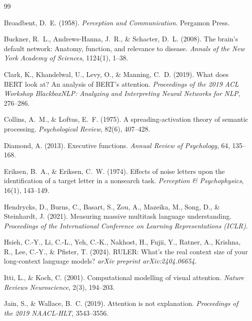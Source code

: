 \documentclass{article}
\begin{document}

\begin{thebibliography}{99}

Broadbent, D.~E. (1958). \emph{Perception and Communication}. Pergamon Press.

Buckner, R.~L., Andrews-Hanna, J.~R., \& Schacter, D.~L. (2008). The brain's default network: Anatomy, function, and relevance to disease. \emph{Annals of the New York Academy of Sciences}, 1124(1), 1--38.

Clark, K., Khandelwal, U., Levy, O., \& Manning, C.~D. (2019). What does BERT look at? An analysis of BERT's attention. \emph{Proceedings of the 2019 ACL Workshop BlackboxNLP: Analyzing and Interpreting Neural Networks for NLP}, 276--286.

Collins, A.~M., \& Loftus, E.~F. (1975). A spreading-activation theory of semantic processing. \emph{Psychological Review}, 82(6), 407--428.

Diamond, A. (2013). Executive functions. \emph{Annual Review of Psychology}, 64, 135--168.

Eriksen, B.~A., \& Eriksen, C.~W. (1974). Effects of noise letters upon the identification of a target letter in a nonsearch task. \emph{Perception \& Psychophysics}, 16(1), 143--149.

Hendrycks, D., Burns, C., Basart, S., Zou, A., Mazeika, M., Song, D., \& Steinhardt, J. (2021). Measuring massive multitask language understanding. \emph{Proceedings of the International Conference on Learning Representations (ICLR)}.

Hsieh, C.-Y., Li, C.-L., Yeh, C.-K., Nakhost, H., Fujii, Y., Ratner, A., Krishna, R., Lee, C.-Y., \& Pfister, T. (2024). RULER: What's the real context size of your long-context language models? \emph{arXiv preprint arXiv:2404.06654}.

Itti, L., \& Koch, C. (2001). Computational modelling of visual attention. \emph{Nature Reviews Neuroscience}, 2(3), 194--203.

Jain, S., \& Wallace, B.~C. (2019). Attention is not explanation. \emph{Proceedings of the 2019 NAACL-HLT}, 3543--3556.


\end{thebibliography}
\end{document}
